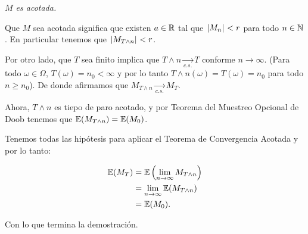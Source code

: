 \emph{
    $M$ es acotada.
}

\afterstatement\pn

Que $M$ sea acotada significa que existen $a \in  \mathbb{R}$ tal que $\hspace{.25mm}\left|M_n\right|\hspace{.25mm} < r$ para todo $n \in \mathbb{N}$. En particular 
tenemos que $\hspace{.25mm}\left|M_{T \wedge n}\right|\hspace{.25mm} < r$.\pn

Por otro lado, que $T$ sea finito implica que $T \wedge n  \underset{c.s.}\longrightarrow T$ conforme $n \rightarrow \infty$.
(Para todo $\omega \in \Omega$, $T(\omega) = n_0 < \infty$ y por lo tanto $T \wedge n (\omega) = T(\omega) = n_0$ para todo
$n \geq n_0$). De donde afirmamos que $M_{T \wedge n} \underset{c.s.}\longrightarrow M_T$. \pn

Ahora, $T \wedge n$ es tiepo de paro acotado, y por Teorema del Muestreo Opcional de Doob tenemos que 
$\mathbb{E}(M_{T \wedge n}) = \mathbb{E}(M_0)$.\pn

Tenemos todas las hipótesis para aplicar el Teorema de Convergencia Acotada y por lo tanto:

\begin{align}
    \mathbb{E}(M_T)     &=  \mathbb{E}\left(\lim_{n \rightarrow \infty} M_{T \wedge n}\right)       \\
                &=  \lim_{n \rightarrow \infty} \mathbb{E}(M_{T \wedge n})                  \\
                &=  \mathbb{E}(M_0).
\end{align}\pn

Con lo que termina la demostración.
 